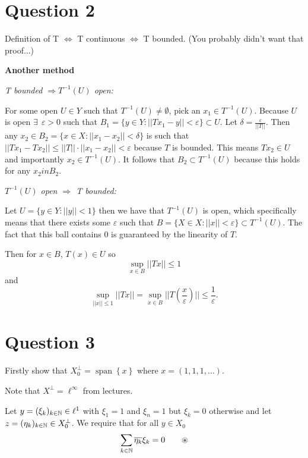 \documentclass{unswmaths}
\begin{document}
\section*{Question 2}

Definition of T $ \Leftrightarrow $ T continuous $ \Leftrightarrow $ T bounded. (You probably didn't want that proof...)

\textbf{Another method}

\emph{T bounded $ \Rightarrow T^{-1}(U) $ open:}

For some open $ U \in Y $ such that $ T^{-1}(U) \neq \emptyset $, pick an $ x_1 \in T^{-1}(U) $.
Because $ U $ is open $ \exists \ \ \varepsilon > 0 $ such that $ B_1 =  \{ y \in Y : ||Tx_1-y|| < \varepsilon \} \subset U $. 
Let $ \delta = \frac{\varepsilon}{||T||} $. Then any $ x_2 \in B_2 = \{ x \in X : ||x_1 - x_2|| < \delta \} $
is such that $ ||Tx_1 - Tx_2|| \leq ||T|| \cdot ||x_1 - x_2 || < \varepsilon $ because $ T $ is bounded. This means $ Tx_2 \in U $ and importantly $ x_2 \in T^{-1}(U) $.
It follows that $ B_2 \subset T^{-1}(U) $ because this holds for any $ x_2 in B_2 $. 


\emph{$ T^{-1}(U) $ open $ \Rightarrow $ T bounded: }

Let $ U = \{ y \in Y : ||y|| < 1 \} $ then we have that $ T^{-1}(U) $ is open, which specifically means that there exists
some $ \varepsilon $ such that $ B = \{ X \in X : ||x|| < \varepsilon \} \subset T^{-1}(U) $. The fact that this ball contains $ 0 $ is guaranteed by the linearity of $ T $.

Then for $ x \in B $, $ T(x) \in U $ so $$ \sup_{x\in B} ||Tx|| \leq 1 $$ and $$ \sup_{||x|| \leq 1} ||T x|| =\sup_{x \in B} ||T(\frac{x}{\varepsilon})||  \leq \frac{1}{\varepsilon}. $$

\section*{Question 3}

Firstly show that $ X_0^\perp = \operatorname{span}\left\{ x \right\} $ where $ x = (1,1,1, \ldots ) $.

Note that $ X^\perp = \ell^\infty $ from lectures. 

Let $ y = (\xi_k)_{k\in\mathbb{N}} \in \ell^1 $ with $ \xi_1 = 1 $ and $ \xi_n = 1 $ but $ \xi_k = 0 $ otherwise and let $ z = ( \eta_k )_{k \in \mathbb{N}} \in X_0^\perp $. We require that for all $ y \in X_0 $
$$
	\sum_{k \in \mathbb{N}} \overline{\eta_k} \xi_k = 0 \ \ \ \ \ \ \circledast
$$
\end{document}
